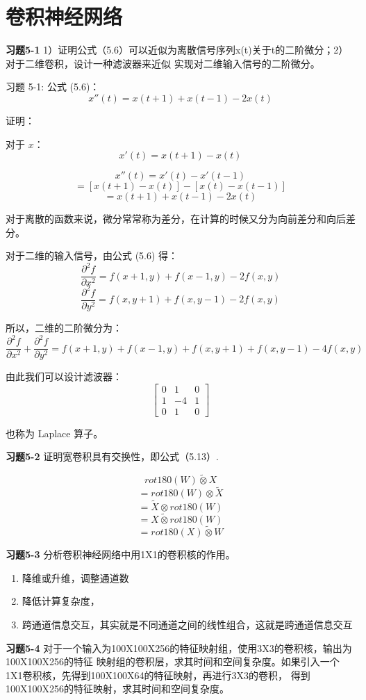 \section{卷积神经网络}

\noindent\textbf{习题5-1} 1）证明公式（5.6）可以近似为离散信号序列x(t)关于t的二阶微分；2）对于二维卷积，设计一种滤波器来近似
实现对二维输入信号的二阶微分。

习题 5-1: 公式 (5.6)：
\[
x''(t) = x(t+1) + x(t-1) - 2x(t) \tag{5.6}
\]

证明：

对于 \(x\)：
\[
x'(t) = x(t+1) - x(t)
\]

\[
x''(t) = x'(t) - x'(t-1)
\]
\[
= [x(t+1) - x(t)] - [x(t) - x(t-1)]
\]
\[
= x(t+1) + x(t-1) - 2x(t)
\]

对于离散的函数来说，微分常常称为差分，在计算的时候又分为向前差分和向后差分。

对于二维的输入信号，由公式 (5.6) 得：
\[
\frac{\partial^2 f}{\partial x^2} = f(x+1, y) + f(x-1, y) - 2f(x, y)
\]
\[
\frac{\partial^2 f}{\partial y^2} = f(x, y+1) + f(x, y-1) - 2f(x, y)
\]

所以，二维的二阶微分为：
\[
\frac{\partial^2 f}{\partial x^2} + \frac{\partial^2 f}{\partial y^2} = f(x+1, y) + f(x-1, y) + f(x, y+1) + f(x, y-1) - 4f(x, y)
\]

由此我们可以设计滤波器：
\[
\begin{bmatrix}
0 & 1 & 0 \\
1 & -4 & 1 \\
0 & 1 & 0
\end{bmatrix}
\]

也称为 Laplace 算子。


\noindent\textbf{习题5-2} 证明宽卷积具有交换性，即公式（5.13）.

\[
rot180(W) \tilde{\otimes} X
\]
\[
= rot180(W) \otimes \tilde{X}
\]
\[
= \tilde{X} \otimes rot180(W)
\]
\[
= X \tilde{\otimes} rot180(W)
\]
\[
= rot180(X) \tilde{\otimes} W
\]


\noindent\textbf{习题5-3} 分析卷积神经网络中用1X1的卷积核的作用。

\begin{enumerate}
\item 降维或升维，调整通道数
\item 降低计算复杂度，
\item 跨通道信息交互，其实就是不同通道之间的线性组合，这就是跨通道信息交互
\end{enumerate}

\noindent\textbf{习题5-4} 对于一个输入为100X100X256的特征映射组，使用3X3的卷积核，输出为100X100X256的特征
映射组的卷积层，求其时间和空间复杂度。如果引入一个1X1卷积核，先得到100X100X64的特征映射，再进行3X3的卷积，
得到100X100X256的特征映射，求其时间和空间复杂度。


